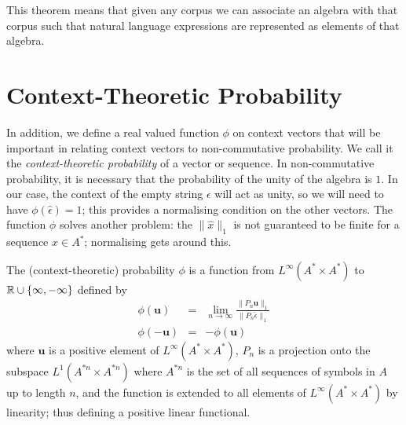 \documentclass[11pt]{report}
\begin{document}
This theorem means that given any corpus we can associate an algebra with that corpus such that natural language expressions are represented as elements of that algebra. %

\section{Context-Theoretic Probability}

In addition, we define a real valued function $\phi$ on context vectors that will be important in relating context vectors to non-commutative probability. We call it the \emph{context-theoretic probability} of a vector or sequence. In non-commutative probability, it is necessary that the probability of the unity of the algebra is $1$. In our case, the context of the empty string $\epsilon$ will act as unity, so we will need to have $\phi(\hat{\epsilon}) = 1$; this provides a normalising condition on the other vectors. The function $\phi$ solves another problem: the $\|\hat{x}\|_1$ is not guaranteed to be finite for a sequence $x \in A^*$; normalising gets around this.
\begin{defn}[Probability]
The (context-theoretic) probability $\phi$ is a function from $L^\infty(A^*\times A^*)$ to $\mathbb{R}\cup\{\infty,-\infty\}$ defined by
\begin{eqnarray*}\phi(\mathbf{u}) &=& \lim_{n\rightarrow\infty} \frac{\|P_n\mathbf{u}\|_1}{\|P_n\hat{\epsilon}\|_1}\\
\phi(-\mathbf{u}) &=& -\phi(\mathbf{u})
\end{eqnarray*}
where $\mathbf{u}$ is a positive element of $L^\infty(A^*\times A^*)$, $P_n$ is a projection onto the subspace $L^1(A^{*n}\times A^{*n})$ where $A^{*n}$ is the set of all sequences of symbols in $A$ up to length $n$, and the function is extended to all elements of $L^\infty(A^*\times A^*)$ by linearity; thus defining a positive linear functional.
\end{defn}
\end{document}
